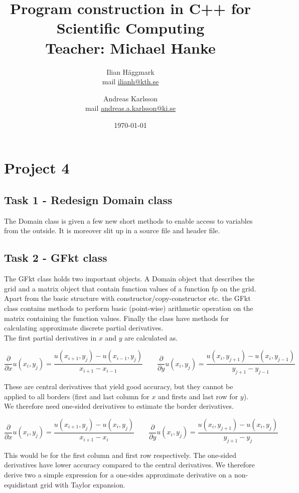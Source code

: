 \documentclass[paper=a4, fontsize=12pt]{article} %
\title{Program construction in C++ for Scientific Computing \\ Teacher: Michael Hanke}
\author{Ilian H{\"a}ggmark \\ mail \href{mailto:ilianh@kth.se}{ilianh@kth.se}
  \and Andreas Karlsson \\ mail \href{mailto:andreas.a.karlsson@ki.se}{andreas.a.karlsson@ki.se} }
\date{\normalsize\today} %
\begin{document}
\maketitle %

\section*{Project 4}
\subsection*{Task 1 - Redesign Domain class}

The Domain class is given a few new short methods to enable access to variables from the outside. It is moreover slit up in a source file and header file.\\


\subsection*{Task 2 - GFkt class}

The GFkt class holds two important objects. A Domain object that describes the grid and a matrix object that contain function values of a function fp on the grid. Apart from the basic structure with constructor/copy-constructor etc. the GFkt class contains methods to perform basic (point-wise) arithmetic operation on the matrix containing the function values. Finally the class have methods for calculating approximate discrete partial derivatives. \\

The first partial derivatives in $x$ and $y$ are calculated as.

$$ \frac{\partial}{\partial x} u(x_i,y_j)  = \frac{u(x_{i+1},y_j)-u(x_{i-1},y_j)}{x_{i+1} - x_{i-1}} \qquad  \frac{\partial}{\partial y} u(x_i,y_j)  = \frac{u(x_{i},y_{j+1})-u(x_{i},y_{j-1})}{y_{j+1} - y_{j-1}}$$

These are central derivatives that yield good accuracy, but they cannot be applied to all borders (first and last column for $x$ and firsts and last row for $y$). We therefore need one-sided derivatives to estimate the border derivatives.

$$ \frac{\partial}{\partial x} u(x_i,y_j)  = \frac{u(x_{i+1},y_j)-u(x_{i},y_j)}{x_{i+1} - x_{i}} \qquad  \frac{\partial}{\partial y} u(x_i,y_j)  = \frac{u(x_{i},y_{j+1})-u(x_{i},y_{j})}{y_{j+1} - y_{j}}$$

This would be for the first column and first row respectively. The one-sided derivatives have lower accuracy compared to the central derivatives. We therefore derive two a simple expression for a one-sides approximate derivative on a non-equidistant grid with Taylor expansion.
\end{document}
